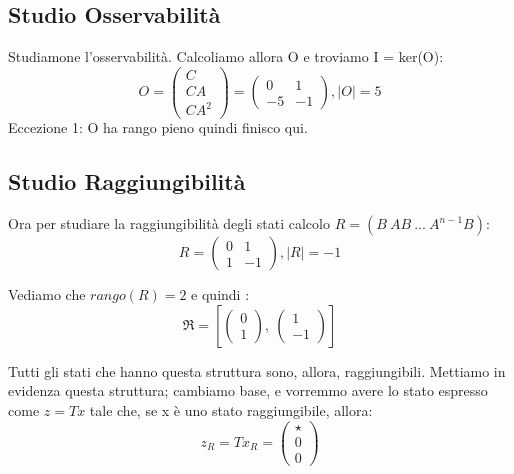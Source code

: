 \documentclass{article}
\begin{document}
\subsection{Studio Osservabilità}

Studiamone l’osservabilità. Calcoliamo allora O e troviamo I = ker(O):
\[
 O = \begin{pmatrix}C \\ CA \\ CA^2 \end{pmatrix} = \left(\begin{matrix}0 & 1\\-5 & -1\end{matrix}\right), |O| = 5 \]
Eccezione 1: O ha rango pieno quindi finisco qui.

\subsection{Studio Raggiungibilità}
Ora per studiare la raggiungibilità degli stati calcolo $R = (B\ AB\ ...\ A^{n-1}B)$: \[ R = \left(\begin{matrix}0 & 1\\1 & -1\end{matrix}\right), |R| = -1 \] 

Vediamo che $rango(R) = 2$ e quindi : \[ \mathfrak{R} = \left[ \left(\begin{matrix}0\\1\end{matrix}\right), \  \left(\begin{matrix}1\\-1\end{matrix}\right)\right] \]

Tutti gli stati che hanno questa struttura sono, allora, raggiungibili. Mettiamo in evidenza questa struttura;
cambiamo base, e vorremmo avere lo stato espresso come $z = Tx$ tale che, se x è uno stato raggiungibile, allora: \[ z_R = T x_R = \begin{pmatrix} \star  \\ 0 \\0\end{pmatrix}\]
\end{document}
